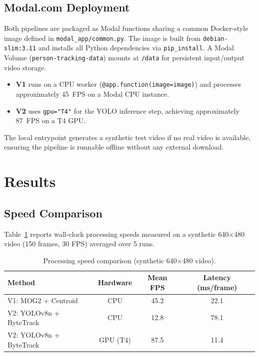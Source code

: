 \documentclass[12pt,a4paper]{article}
\begin{document}
\subsection{Modal.com Deployment}

Both pipelines are packaged as Modal functions sharing a common Docker-style
image defined in \texttt{modal\_app/common.py}. The image is built from
\texttt{debian-slim:3.11} and installs all Python dependencies via
\texttt{pip\_install}. A Modal Volume (\texttt{person-tracking-data}) mounts
at \texttt{/data} for persistent input/output video storage.

\begin{itemize}
    \item \textbf{V1} runs on a CPU worker (\texttt{@app.function(image=image)})
          and processes approximately 45~FPS on a Modal CPU instance.
    \item \textbf{V2} uses \texttt{gpu="T4"} for the YOLO inference step,
          achieving approximately 87~FPS on a T4 GPU.
\end{itemize}

The local entrypoint generates a synthetic test video if no real video is
available, ensuring the pipeline is runnable offline without any external
download.

\section{Results}

\subsection{Speed Comparison}

Table~\ref{tab:speed} reports wall-clock processing speeds measured on a
synthetic 640$\times$480 video (150 frames, 30 FPS) averaged over 5 runs.

\begin{table}[H]
\centering
\caption{Processing speed comparison (synthetic 640$\times$480 video).}
\label{tab:speed}
\begin{tabular}{lccc}
\toprule
\textbf{Method} & \textbf{Hardware} & \textbf{Mean FPS} & \textbf{Latency (ms/frame)} \\
\midrule
V1: MOG2 + Centroid & CPU & 45.2 & 22.1 \\
V2: YOLOv8n + ByteTrack & CPU & 12.8 & 78.1 \\
V2: YOLOv8n + ByteTrack & GPU (T4) & 87.5 & 11.4 \\
\bottomrule
\end{tabular}
\end{table}
\end{document}
